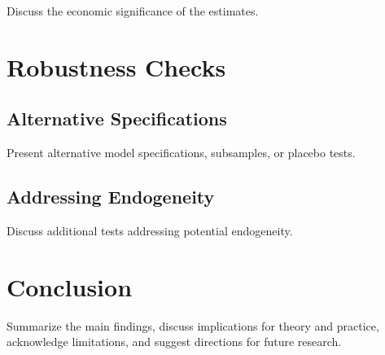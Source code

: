 \documentclass[12pt,a4paper]{article}
\begin{document}
Discuss the economic significance of the estimates.

\section{Robustness Checks}
\label{sec:robustness}

\subsection{Alternative Specifications}

Present alternative model specifications, subsamples, or placebo tests.

\subsection{Addressing Endogeneity}

Discuss additional tests addressing potential endogeneity.

\section{Conclusion}
\label{sec:conclusion}

Summarize the main findings, discuss implications for theory and practice, acknowledge limitations, and suggest directions for future research.

\newpage
\end{document}
